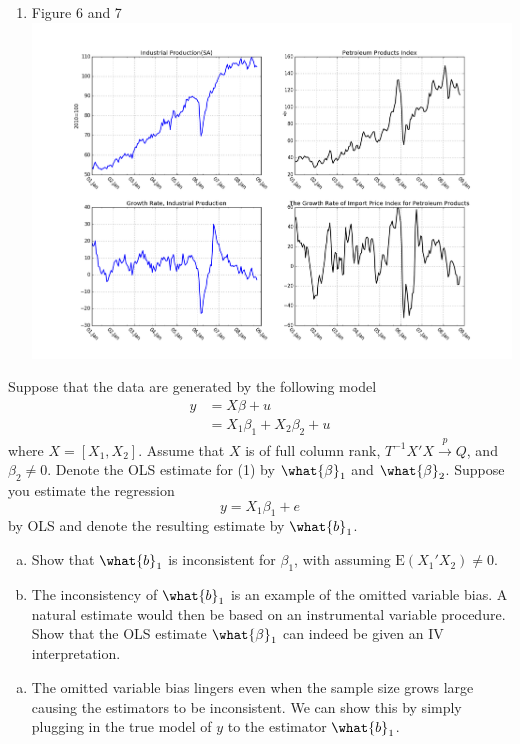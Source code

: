 \documentclass[answers]{exam}
\begin{document}
\begin{questions}
\begin{solution}
\begin{enumerate}[(1)]
      \item Figure 6 and 7
      \includegraphics[scale=0.3]{figure_67.png}
    \end{enumerate}
  \end{solution}
  \question
  Suppose that the data are generated by the following model
  \begin{align}
    y &= X\beta+u\\
      &= X_{1}\beta_{1}+X_{2}\beta_{2}+u
  \end{align}
  where $X=\left[X_{1},X_{2}\right]$. Assume that $X$ is of full column rank, $T^{-1}X'X\xrightarrow{p}Q$, and $\beta_{2}\neq 0$. Denote the OLS estimate for (1) by $\what{\beta}_{1}$ and $\what{\beta}_{2}$. Suppose you estimate the regression
  \begin{equation}
    y=X_{1}\beta_{1}+e
  \end{equation}
  by OLS and denote the resulting estimate by $\what{b}_{1}$.
  \begin{enumerate}[a)]
    \item Show that $\what{b}_{1}$ is inconsistent for $\beta_{1}$, with assuming $\mathrm{E}\left(X_{1}'X_{2}^{}\right)\neq 0$.
    \item The inconsistency of $\what{b}_{1}$ is an example of the omitted variable bias. A natural estimate would then be based on an instrumental variable procedure. Show that the OLS estimate $\what{\beta}_{1}$ can indeed be given an IV interpretation.
  \end{enumerate}
  \begin{solution}
    \begin{enumerate}[a)]
      \item The omitted variable bias lingers even when the sample size grows large causing the estimators to be inconsistent. We can show this by simply plugging in the true model of $y$ to the estimator $\what{b}_{1}$.

\end{enumerate}
\end{solution}
\end{questions}
\end{document}
